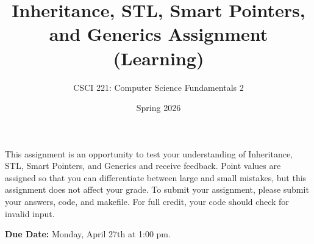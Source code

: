 \documentclass{exam}
\begin{document}
\title{Inheritance, STL, Smart Pointers, and Generics Assignment (Learning)}
\author{CSCI 221: Computer Science Fundamentals 2}
\date{Spring 2026}
\maketitle


This assignment is an opportunity to test your understanding of Inheritance, STL, Smart Pointers, and Generics and receive feedback. 
Point values are assigned so that you can differentiate between large and small mistakes, but this assignment does not affect your grade. 
To submit your assignment, please submit your answers, code, and makefile. 
For full credit, your code should check for invalid input. 

\textbf{Due Date:}
Monday, April 27th at 1:00 pm. 
\end{document}
